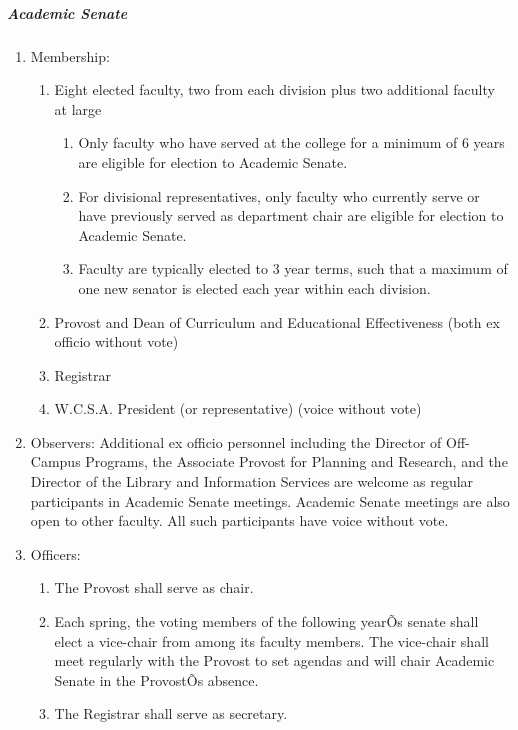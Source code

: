 \documentclass[letterpaper, 11pt]{article}
\begin{document}
				\subparagraph{Academic Senate}
					\begin{enumerate}[label=\alph*)]
						\item{Membership:
							\begin{enumerate}[label=\arabic*)]
								\item{Eight elected faculty, two from each division plus two additional faculty at large
									\begin{enumerate}[label=(\alph*)]
										\item{Only faculty who have served at the college for a minimum of 6 years are eligible for election to Academic Senate.}
										\item{For divisional representatives, only faculty who currently serve or have previously served as department chair are eligible for election to Academic Senate.}
										\item{Faculty are typically elected to 3 year terms, such that a maximum of one new senator is elected each year within each division.}
									\end{enumerate}
								}
								\item{Provost and Dean of Curriculum and Educational Effectiveness (both ex officio without vote)}
								\item{Registrar}
								\item{W.C.S.A. President (or representative) (voice without vote)}
							\end{enumerate}
						}
						\item{Observers:  Additional ex officio personnel including the Director of Off-Campus Programs, the Associate Provost for Planning and Research, and the Director of the Library and Information Services are welcome as regular participants in Academic Senate meetings.  Academic Senate meetings are also open to other faculty.  All such participants have voice without vote.}
						\item{Officers:
							\begin{enumerate}[label=\arabic*)]
								\item{The Provost shall serve as chair.}
								\item{Each spring, the voting members of the following yearÕs senate shall elect a vice-chair from among its faculty members.  The vice-chair shall meet regularly with the Provost to set agendas and will chair Academic Senate in the ProvostÕs absence.}
								\item{The Registrar shall serve as secretary.}
							\end{enumerate}
}
\end{enumerate}
\end{document}
